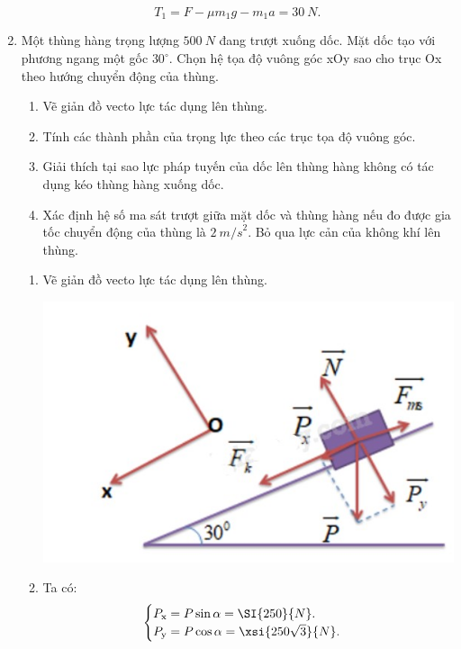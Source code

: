 \begin{enumerate}[label=\bfseries Câu \arabic*:]
{		$$T_1 = F - \mu m_1 g - m_1 a  = \SI{30}{N}.$$
		
		
	}
	\item {}
	
	
	{
		Một thùng hàng trọng lượng $\SI{500}{N}$ đang trượt xuống dốc. Mặt dốc tạo với phương ngang một gốc $30^\circ$. Chọn hệ tọa độ vuông góc xOy sao cho trục Ox theo hướng chuyển động của thùng.
		\begin{enumerate}[label=\alph*)]
			\item  Vẽ giản đồ vecto lực tác dụng lên thùng.
			\item Tính các thành phần của trọng lực theo các trục tọa độ vuông góc.
			\item Giải thích tại sao lực pháp tuyến của dốc lên thùng hàng không có tác dụng kéo thùng hàng xuống dốc.
			\item Xác định hệ số ma sát trượt giữa mặt dốc và thùng hàng nếu đo được gia tốc chuyển động của thùng là $\SI{2}{m/s}^2$. Bỏ qua lực cản của không khí lên thùng.
		\end{enumerate}
	}
	
	\hideall
	{
		
			\begin{enumerate}[label=\alph*)]
			\item  Vẽ giản đồ vecto lực tác dụng lên thùng.
			
			
			\begin{center}
				\includegraphics[scale=0.6]{../figs/VN10-2022-PH-TP021-14.jpg}
			\end{center}
			
			\item 
			Ta có:
			$$\begin{cases}
			P_\text{x}= P\sin \alpha = \SI{250}{N}.   \\
			P_\text{y}= P \cos \alpha = \xsi{250\sqrt 3}{N}.
			\end{cases}$$
			

\end{enumerate}}
\end{enumerate}
